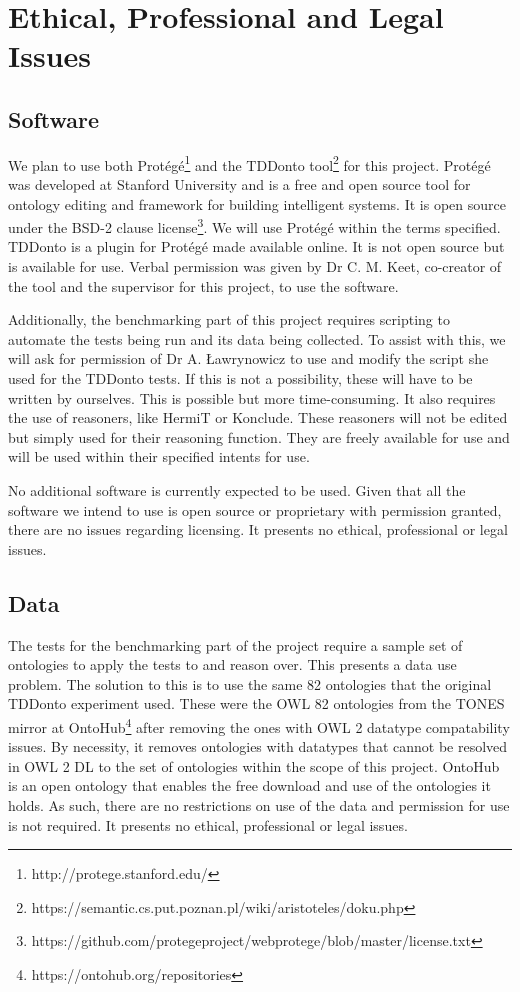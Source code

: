 \documentclass[draft]{sig-alternate}
\begin{document}
\section{Ethical, Professional and Legal Issues}

\subsection{Software}

We plan to use both Prot{\'e}g{\'e}\footnote{http://protege.stanford.edu/} and the TDDonto tool\footnote{https://semantic.cs.put.poznan.pl/wiki/aristoteles/doku.php} for this project. Prot{\'e}g{\'e} was developed at Stanford University and is a free and open source tool for ontology editing and framework for building intelligent systems. It is open source under the BSD-2 clause license\footnote{https://github.com/protegeproject/webprotege/blob/master/license.txt}. We will use Prot{\'e}g{\'e} within the terms specified. TDDonto is a plugin for Prot{\'e}g{\'e} made available online. It is not open source but is available for use. Verbal permission was given by Dr C. M. Keet, co-creator of the tool and the supervisor for this project, to use the software.

Additionally, the benchmarking part of this project requires scripting to automate the tests being run and its data being collected. To assist with this, we will ask for permission of Dr A. {\L}awrynowicz to use and modify the script she used for the TDDonto tests\cite{DBLP:conf/dlog/LawrynowiczK16}. If this is not a possibility, these will have to be written by ourselves. This is possible but more time-consuming. It also requires the use of reasoners, like HermiT or Konclude. These reasoners will not be edited but simply used for their reasoning function. They are freely available for use and will be used within their specified intents for use.

No additional software is currently expected to be used. Given that all the software we intend to use is open source or proprietary with permission granted, there are no issues regarding licensing. It presents no ethical, professional or legal issues.

\subsection{Data}

The tests for the benchmarking part of the project require a sample set of ontologies to apply the tests to and reason over. This presents a data use problem. The solution to this is to use the same 82 ontologies that the original TDDonto experiment used\cite{DBLP:conf/dlog/LawrynowiczK16}. These were the OWL 82 ontologies from the TONES mirror at OntoHub\footnote{https://ontohub.org/repositories} after removing the ones with OWL 2 datatype compatability issues. By necessity, it removes ontologies with datatypes that cannot be resolved in OWL 2 DL to the set of ontologies within the scope of this project. OntoHub is an open ontology that enables the free download and use of the ontologies it holds. As such, there are no restrictions on use of the data and permission for use is not required. It presents no ethical, professional or legal issues.
\end{document}
